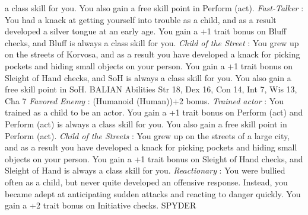 a class skill for you. You also gain a free skill point in Perform (act).   {\itshape Fast-Talker} : You had a knack at getting yourself into trouble as a child, and as a result developed a silver tongue at an early age. You gain a +1 trait bonus on Bluff checks, and Bluff is always a class skill for you.   {\itshape Child of the Street} : You grew up on the streets of Korvosa, and as a result you have developed a knack for picking pockets and hiding small objects on your person. You gain a +1 trait bonus on Sleight of Hand checks, and SoH is always a class skill for you. You also gain a free skill point in SoH. BALIAN         Abilities Str 18, Dex 16, Con 14, Int 7, Wis 13, Cha 7    {\itshape Favored Enemy} : (Humanoid (Human))+2 bonus.   {\itshape Trained actor} : You trained as a child to be an actor. You gain a +1 trait bonus on Perform (act) and Perform (act) is always a class skill for you. You also gain a free skill point in Perform (act).   {\itshape Child of the Streets} : You grew up on the streets of a large city, and as a result you have developed a knack for picking pockets and hiding small objects on your person. You gain a +1 trait bonus on Sleight of Hand checks, and Sleight of Hand is always a class skill for you.   {\itshape Reactionary} : You were bullied often as a child, but never quite developed an offensive response. Instead, you became adept at anticipating sudden attacks and reacting to danger quickly. You gain a +2 trait bonus on Initiative checks. SPYDER   


         